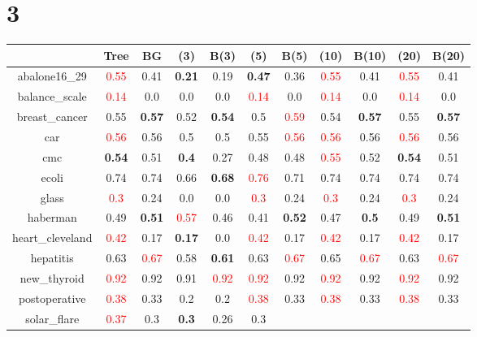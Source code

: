 \documentclass{article}%
\begin{document}
\section*{3}%
\begin{tabular}{c|cccccccccc}%
\hline%
&Tree&BG&(3)&B(3)&(5)&B(5)&(10)&B(10)&(20)&B(20)\\%
\hline%
abalone16\_29&\textcolor{red}{ 
0.55
}&0.41&\textbf{0.21}&0.19&\textbf{0.47}&0.36&\textcolor{red}{ 
0.55
}&0.41&\textcolor{red}{ 
0.55
}&0.41\\%
\hline%
balance\_scale&\textcolor{red}{ 
0.14
}&0.0&0.0&0.0&\textcolor{red}{ 
0.14
}&0.0&\textcolor{red}{ 
0.14
}&0.0&\textcolor{red}{ 
0.14
}&0.0\\%
\hline%
breast\_cancer&0.55&\textbf{0.57}&0.52&\textbf{0.54}&0.5&\textcolor{red}{ 
0.59
}&0.54&\textbf{0.57}&0.55&\textbf{0.57}\\%
\hline%
car&\textcolor{red}{ 
0.56
}&0.56&0.5&0.5&0.55&\textcolor{red}{ 
0.56
}&\textcolor{red}{ 
0.56
}&0.56&\textcolor{red}{ 
0.56
}&0.56\\%
\hline%
cmc&\textbf{0.54}&0.51&\textbf{0.4}&0.27&0.48&0.48&\textcolor{red}{ 
0.55
}&0.52&\textbf{0.54}&0.51\\%
\hline%
ecoli&0.74&0.74&0.66&\textbf{0.68}&\textcolor{red}{ 
0.76
}&0.71&0.74&0.74&0.74&0.74\\%
\hline%
glass&\textcolor{red}{ 
0.3
}&0.24&0.0&0.0&\textcolor{red}{ 
0.3
}&0.24&\textcolor{red}{ 
0.3
}&0.24&\textcolor{red}{ 
0.3
}&0.24\\%
\hline%
haberman&0.49&\textbf{0.51}&\textcolor{red}{ 
0.57
}&0.46&0.41&\textbf{0.52}&0.47&\textbf{0.5}&0.49&\textbf{0.51}\\%
\hline%
heart\_cleveland&\textcolor{red}{ 
0.42
}&0.17&\textbf{0.17}&0.0&\textcolor{red}{ 
0.42
}&0.17&\textcolor{red}{ 
0.42
}&0.17&\textcolor{red}{ 
0.42
}&0.17\\%
\hline%
hepatitis&0.63&\textcolor{red}{ 
0.67
}&0.58&\textbf{0.61}&0.63&\textcolor{red}{ 
0.67
}&0.65&\textcolor{red}{ 
0.67
}&0.63&\textcolor{red}{ 
0.67
}\\%
\hline%
new\_thyroid&\textcolor{red}{ 
0.92
}&0.92&0.91&\textcolor{red}{ 
0.92
}&\textcolor{red}{ 
0.92
}&0.92&\textcolor{red}{ 
0.92
}&0.92&\textcolor{red}{ 
0.92
}&0.92\\%
\hline%
postoperative&\textcolor{red}{ 
0.38
}&0.33&0.2&0.2&\textcolor{red}{ 
0.38
}&0.33&\textcolor{red}{ 
0.38
}&0.33&\textcolor{red}{ 
0.38
}&0.33\\%
\hline%
solar\_flare&\textcolor{red}{ 
0.37
}&0.3&\textbf{0.3}&0.26&0.3&\textcolor{red}{ 
}
\end{tabular}
\end{document}
